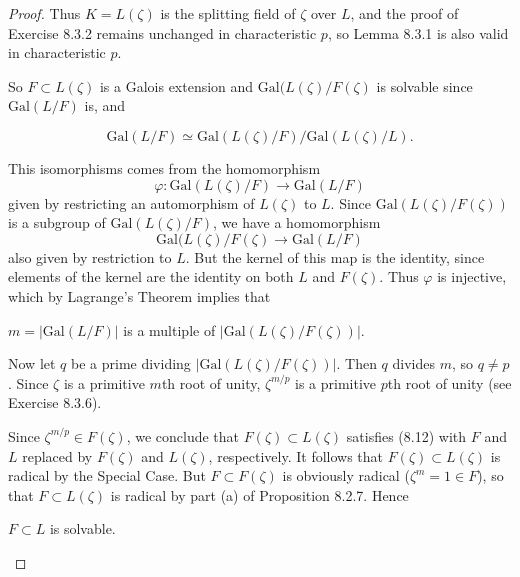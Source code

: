 \documentclass[11pt,a4paper]{article}
\newcommand{\Gal}{\mathrm{Gal}}
\begin{document}
\begin{proof}
Thus $K = L(\zeta)$ is the splitting field of $\zeta$ over $L$, and the proof of Exercise 8.3.2 remains unchanged in characteristic $p$, so Lemma 8.3.1 is also valid in characteristic $p$.

So $F \subset L(\zeta)$ is a Galois extension and  $\Gal(L(\zeta)/F(\zeta)$ is solvable since $\Gal(L/F)$ is, and

$$\Gal(L/F) \simeq \Gal(L(\zeta)/F)/\Gal(L(\zeta)/L).$$

This isomorphisms comes from the homomorphism
$$\varphi : \Gal(L(\zeta)/F) \to \Gal(L/F)$$
given by restricting an automorphism of $L(\zeta)$ to $L$. Since $\Gal(L(\zeta)/F(\zeta))$ is a subgroup of $\Gal(L(\zeta)/F)$, we have a homomorphism
$$\Gal(L(\zeta)/F(\zeta) \to \Gal(L/F)$$
also given by restriction to $L$. But the kernel of this map is the identity, since elements of the kernel are the identity on both $L$ and $F(\zeta)$. Thus $\varphi$ is injective, which by Lagrange's Theorem implies that
\begin{center}
$m = |\Gal(L/F)|$ is a multiple of $|\Gal(L(\zeta)/F(\zeta))|$.
\end{center}

Now let $q$ be a prime dividing $|\Gal(L(\zeta)/F(\zeta))|$. Then $q$ divides $m$, so $q\ne p$. Since $\zeta$ is a primitive $m$th root of unity, $\zeta^{m/p}$ is a primitive $p$th root of unity (see Exercise 8.3.6). 

Since $\zeta^{m/p} \in F(\zeta)$, we conclude that $F(\zeta) \subset L(\zeta)$ satisfies (8.12) with $F$ and $L$ replaced by $F(\zeta)$ and $L(\zeta)$, respectively. It follows that $F(\zeta)\subset L(\zeta)$ is radical by the Special Case. But $F \subset F(\zeta)$ is obviously radical ($\zeta^m = 1 \in F$), so that $F \subset L(\zeta)$ is radical by part (a) of Proposition 8.2.7. Hence 
\begin{center}
$F\subset L$ is solvable.
\end{center}
\end{proof}
\end{document}
